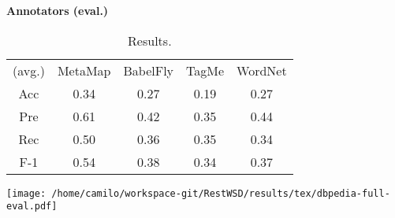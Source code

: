 \begin{center}\textbf{\Large Annotators (eval.)}\end{center}
\begin{center}\begin{table}[p]\centering
\begin{tabular}{ccccc}
(avg.) & MetaMap & BabelFly & TagMe & WordNet\\ 
Acc & 0.34 & 0.27 & 0.19 & 0.27\\ 
Pre & 0.61 & 0.42 & 0.35 & 0.44\\ 
Rec & 0.50 & 0.36 & 0.35 & 0.34\\ 
F-1 & 0.54 & 0.38 & 0.34 & 0.37\\ 

\end{tabular}\caption{Results.}\end{table}\end{center}



\vspace{0.2cm}

\begin{center}
\texttt{[image: /home/camilo/workspace-git/RestWSD/results/tex/dbpedia-full-eval.pdf]}
\end{center}
\newpage
